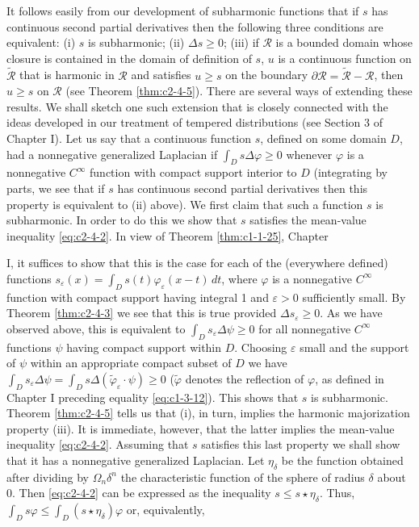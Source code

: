  It follows easily from our development of subharmonic functions that if $s$ has continuous second partial derivatives then the following three conditions are equivalent: (i) $s$ is subharmonic; (ii) $\Delta s \geq 0$; (iii) if $\mathcal{R}$ is a bounded domain whose closure is contained in the domain of definition of $s$, $u$ is a continuous function on $\tilde{\mathcal{R}}$ that is harmonic in $\mathcal{R}$ and satisfies $u \geq s$ on the boundary $\partial \mathcal{R} = \tilde{\mathcal{R}} - \mathcal{R}$, then $u \geq s$ on $\mathcal{R}$ (see Theorem \ref{thm:c2-4-5}). There are several ways of extending these results. We shall sketch one such extension that is closely connected with the ideas developed in our treatment of tempered distributions (see Section 3 of Chapter I). Let us say that a continuous function $s$, defined on some domain $D$, had a nonnegative generalized Laplacian if $\int_{D} s \Delta \varphi \geq 0$ whenever $\varphi$ is a nonnegative $C^{\infty}$ function with compact support interior to $D$ (integrating by parts, we see that if $s$ has continuous second partial derivatives then this property is equivalent to (ii) above). We first claim that such a function $s$ is subharmonic. In order to do this we show that $s$ satisfies the mean-value inequality \eqref{eq:c2-4-2}. In view of Theorem \ref{thm:c1-1-25}, Chapter

I, it suffices to show that this is the case for each of the (everywhere defined) functions $s_\varepsilon(x) = \int_D s(t)\varphi_\varepsilon(x - t)\,dt$, where $\varphi$ is a nonnegative $C^\infty$ function with compact support having integral 1 and $\varepsilon > 0$ sufficiently small. By Theorem \ref{thm:c2-4-3} we see that this is true provided $\Delta s_\varepsilon \geq 0$. As we have observed above, this is equivalent to $\int_D s_\varepsilon\Delta\psi \geq 0$ for all nonnegative $C^\infty$ functions $\psi$ having compact support within $D$. Choosing $\varepsilon$ small and the support of $\psi$ within an appropriate compact subset of $D$ we have $\int_D s_\varepsilon\Delta\psi = \int_D s\Delta(\tilde{\varphi}_\varepsilon \cdot \psi) \geq 0$ ($\tilde{\varphi}$ denotes the reflection of $\varphi$, as defined in Chapter I preceding equality \eqref{eq:c1-3-12}). This shows that $s$ is subharmonic. Theorem \ref{thm:c2-4-5} tells us that (i), in turn, implies the harmonic majorization property (iii). It is immediate, however, that the latter implies the mean-value inequality \eqref{eq:c2-4-2}. Assuming that $s$ satisfies this last property we shall show that it has a nonnegative generalized Laplacian. Let $\eta_\delta$ be the function obtained after dividing by $\Omega_n\delta^n$ the characteristic function of the sphere of radius $\delta$ about 0. Then \eqref{eq:c2-4-2} can be expressed as the inequality $s \leq s \star \eta_\delta$. Thus, $\int_D s\varphi \leq \int_D (s \star \eta_\delta)\varphi$ or, equivalently,


